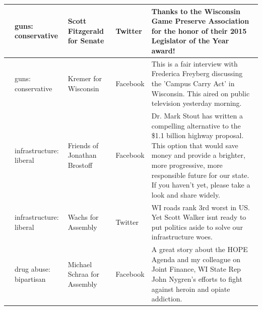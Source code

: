 \documentclass[12pt,]{article}
\begin{document}
\begin{longtable}[t]{>{\raggedright\arraybackslash}p{.65in}|>{\raggedright\arraybackslash}p{1in}|>{\raggedright\arraybackslash}p{1in}|>{\raggedright\arraybackslash}p{.7in}|>{\raggedright\arraybackslash}p{2.5in}}
\hline
8 & guns: conservative & Scott Fitzgerald for Senate & Twitter & Thanks to the Wisconsin Game Preserve Association for the honor of their 2015 Legislator of the Year award!\\
\hline
9 & guns: conservative & Kremer for Wisconsin & Facebook & This is a fair interview with Frederica Freyberg discussing the 'Campus Carry Act' in Wisconsin.  This aired on public television yesterday morning.\\
\hline
10 & infrastructure: liberal & Friends of Jonathan Brostoff & Facebook & Dr. Mark Stout has written a compelling alternative to the \$1.1 billion highway proposal. This option that would save money and provide a brighter, more progressive, more responsible future for our state. If you haven't yet, please take a look and share widely.\\
\hline
11 & infrastructure: liberal & Wachs for Assembly & Twitter & WI roads rank 3rd worst in US. Yet Scott Walker isnt ready to put politics aside to solve our infrastructure woes.\\
\hline
12 & drug abuse: bipartisan & Michael Schraa for Assembly & Facebook & A great story about the HOPE Agenda and my colleague on Joint Finance, WI State Rep John Nygren's efforts to fight against heroin and opiate addiction.\\
\hline
\end{longtable}





\newpage

\singlespacing 
\end{document}
